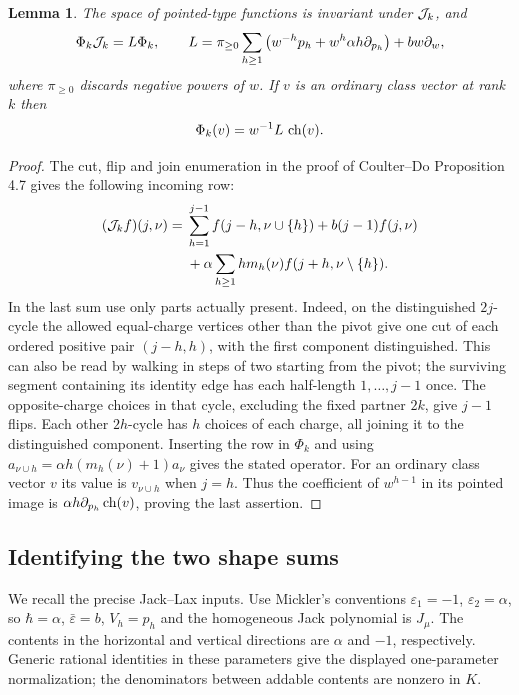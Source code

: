 \documentclass[11pt,a4paper]{article}
\newtheorem{SourceRceMlemma}{Lemma}
\begin{document}
\begin{SourceRceMlemma}\label{R24M:iso}
The space of pointed-type functions is invariant under $\mathcal J_k$, and
\[
 \Phi_k\mathcal J_k=L\Phi_k,\qquad
 L=\pi_{\ge0}\sum_{h\ge1}\left(w^{-h}p_h+w^h\alpha h\partial_{p_h}\right)
               +b w\partial_w,
\]
where $\pi_{\ge0}$ discards negative powers of $w$.
If $v$ is an ordinary class vector at rank $k$ then
\[
    \Phi_k(v)= w^{-1}L\,\operatorname{ch}(v).
\]
\end{SourceRceMlemma}
\begin{proof}
The cut, flip and join enumeration in the proof of Coulter--Do Proposition 4.7 gives the following incoming row:
\begin{align*}
 (\mathcal J_k f)(j,\nu)={}&
  \sum_{h=1}^{j-1} f(j-h,\nu\cup\{h\})
  + b(j-1)f(j,\nu)\\
 &+\alpha\sum_{h\ge1} h m_h(\nu) f(j+h,\nu\setminus\{h\}) .
\end{align*}
In the last sum use only parts actually present. Indeed, on the distinguished $2j$-cycle the allowed equal-charge vertices other than the pivot give one cut of each ordered positive pair $(j-h,h)$, with the first component distinguished. This can also be read by walking in steps of two starting from the pivot; the surviving segment containing its identity edge has each half-length $1,\ldots,j-1$ once. The opposite-charge choices in that cycle, excluding the fixed partner $2k$, give $j-1$ flips. Each other $2h$-cycle has $h$ choices of each charge, all joining it to the distinguished component. Inserting the row in $\Phi_k$ and using $a_{\nu\cup h}=\alpha h(m_h(\nu)+1)a_\nu$ gives the stated operator. For an ordinary class vector $v$ its value is $v_{\nu\cup h}$ when $j=h$. Thus the coefficient of $w^{h-1}$ in its pointed image is $\alpha h\partial_{p_h}\operatorname{ch}(v)$, proving the last assertion.
\end{proof}

\subsection{Identifying the two shape sums}
We recall the precise Jack--Lax inputs. Use Mickler's conventions $\varepsilon_1=-1$, $\varepsilon_2=\alpha$, so $\hbar=\alpha$, $\bar\varepsilon=b$, $V_h=p_h$ and the homogeneous Jack polynomial is $J_\mu$. The contents in the horizontal and vertical directions are $\alpha$ and $-1$, respectively. Generic rational identities in these parameters give the displayed one-parameter normalization; the denominators between addable contents are nonzero in $K$.
\end{document}
